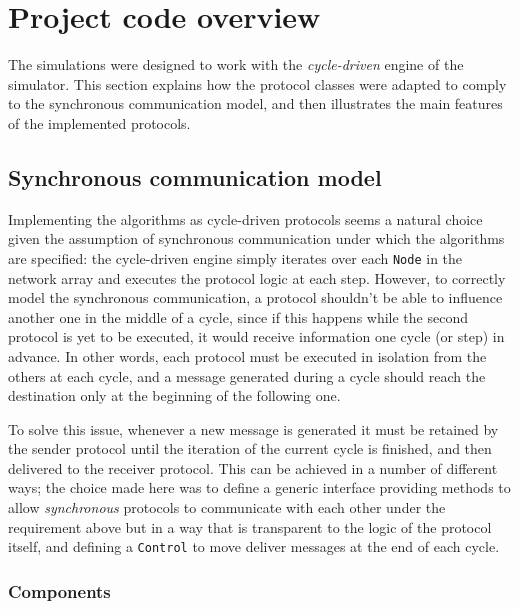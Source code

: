 
\section{Project code overview} \label{sec:code}


The simulations were designed to work with the \emph{cycle-driven} engine of the \peersim{} \cite{peersim} simulator. This section explains how the protocol classes were adapted to comply to the synchronous communication model, and then illustrates the main features of the implemented protocols.

\subsection{Synchronous communication model}

Implementing the algorithms as cycle-driven protocols seems a natural choice given the assumption of synchronous communication under which the algorithms are specified: the cycle-driven engine simply iterates over each \texttt{Node} in the network array and executes the protocol logic at each step. However, to correctly model the synchronous communication, a protocol shouldn't be able to influence another one in the middle of a cycle, since if this happens while the second protocol is yet to be executed, it would receive information one cycle (or step) in advance. In other words, each protocol must be executed in isolation from the others at each cycle, and a message generated during a cycle should reach the destination only at the beginning of the following one.

To solve this issue, whenever a new message is generated it must be retained by the sender protocol until the iteration of the current cycle is finished, and then delivered to the receiver protocol. This can be achieved in a number of different ways; the choice made here was to define a generic interface providing methods to allow \emph{synchronous} protocols to communicate with each other under the requirement above but in a way that is transparent to the logic of the protocol itself, and defining a \peersim{} \texttt{Control} to move deliver messages at the end of each cycle.

\subsubsection{Components}

